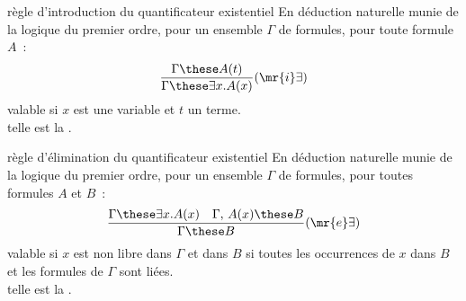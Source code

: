 \begin{definition}{7.28}{règle d'introduction du quantificateur existentiel}
    En déduction naturelle munie de la logique du premier ordre, pour un ensemble $\Gamma$ de formules, pour toute formule $A$~:
    $$\frac{\Gamma \these A(t)}{\Gamma \these \exists x.A(x)}(\mr{i}\exists)$$
    valable si $x$ est une variable et $t$ un terme.\\
    telle est la .
\end{definition}

\begin{definition}{7.29}{règle d'élimination du quantificateur existentiel}
    En déduction naturelle munie de la logique du premier ordre, pour un ensemble $\Gamma$ de formules, pour toutes formules $A$ et $B$~:
    $$\frac{\Gamma \these \exists x.A(x) \quad \Gamma,\,A(x) \these B}{\Gamma \these B}(\mr{e}\exists)$$
    valable si $x$ est non libre dans $\Gamma$ et dans $B$ \ie si toutes les occurrences de $x$ dans $B$ et les formules de $\Gamma$ sont liées.\\
    telle est la .
\end{definition} 

